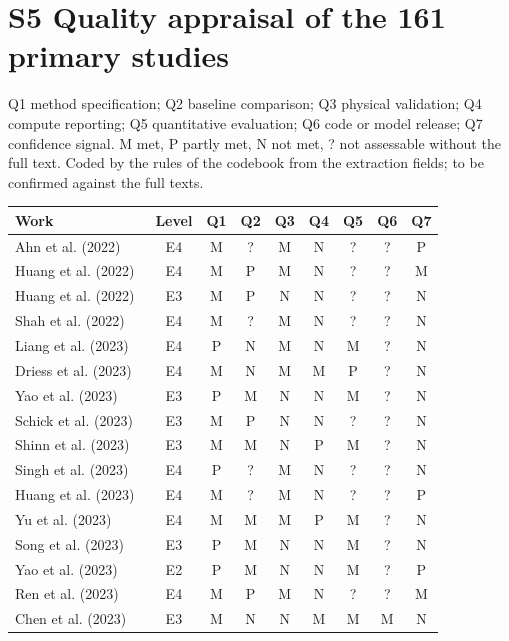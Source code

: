 \documentclass[10pt,a4paper]{article}
\begin{document}
\section*{S5 Quality appraisal of the 161 primary studies}
Q1 method specification; Q2 baseline comparison; Q3 physical validation; Q4 compute reporting; Q5 quantitative evaluation; Q6 code or model release; Q7 confidence signal. M met, P partly met, N not met, ? not assessable without the full text. Coded by the rules of the codebook from the extraction fields; to be confirmed against the full texts.
\begin{longtable}{@{}>{\raggedright\arraybackslash}p{5.5cm}cccccccc@{}}
\toprule \textbf{Work} & \textbf{Level} & \textbf{Q1} & \textbf{Q2} & \textbf{Q3} & \textbf{Q4} & \textbf{Q5} & \textbf{Q6} & \textbf{Q7} \\ \midrule \endhead
Ahn et al. (2022)~\cite{Ahn2022} & E4 & M & ? & M & N & ? & ? & P \\
Huang et al. (2022)~\cite{Huang2022b} & E4 & M & P & M & N & ? & ? & M \\
Huang et al. (2022)~\cite{Huang2022a} & E3 & M & P & N & N & ? & ? & N \\
Shah et al. (2022)~\cite{Shah2022} & E4 & M & ? & M & N & ? & ? & N \\
Liang et al. (2023)~\cite{Liang2023} & E4 & P & N & M & N & M & ? & N \\
Driess et al. (2023)~\cite{Driess2023} & E4 & M & N & M & M & P & ? & N \\
Yao et al. (2023)~\cite{Yao2023a} & E3 & P & M & N & N & M & ? & N \\
Schick et al. (2023)~\cite{Schick2023} & E3 & M & P & N & N & ? & ? & N \\
Shinn et al. (2023)~\cite{Shinn2023} & E3 & M & M & N & P & M & ? & N \\
Singh et al. (2023)~\cite{Singh2023} & E4 & P & ? & M & N & ? & ? & N \\
Huang et al. (2023)~\cite{Huang2023a} & E4 & M & ? & M & N & ? & ? & P \\
Yu et al. (2023)~\cite{Yu2023} & E4 & M & M & M & P & M & ? & N \\
Song et al. (2023)~\cite{Song2023} & E3 & P & M & N & N & M & ? & N \\
Yao et al. (2023)~\cite{Yao2023b} & E2 & P & M & N & N & M & ? & P \\
Ren et al. (2023)~\cite{Ren2023} & E4 & M & P & M & N & ? & ? & M \\
Chen et al. (2023)~\cite{Chen2023b} & E3 & M & N & N & M & M & M & N \\

\end{longtable}
\end{document}
